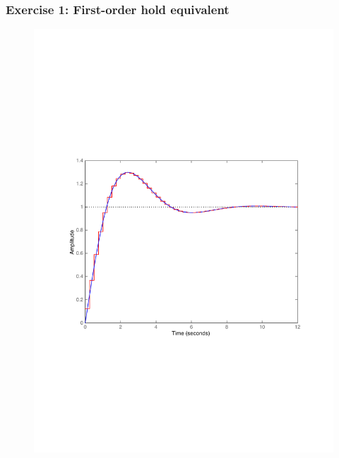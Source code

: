 \begin{frame}
	\frametitle{Exercise 1: First-order hold equivalent}
	\vspace{-0.7em}
	\begin{figure}
		\centering
		\includegraphics[width=0.8\linewidth]{vb2}
	\end{figure}
\end{frame}

